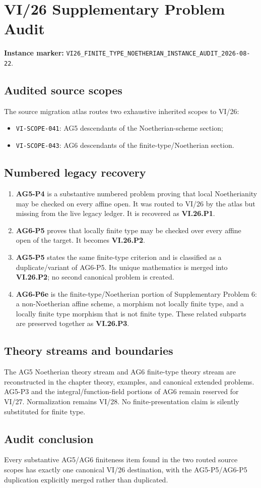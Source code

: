 \chapter*{VI/26 Supplementary Problem Audit}
\label{audit:vi26}
\textbf{Instance marker:} \texttt{VI26\_FINITE\_TYPE\_NOETHERIAN\_INSTANCE\_AUDIT\_2026-08-22}.

\section*{Audited source scopes}
The source migration atlas routes two exhaustive inherited scopes to VI/26:
\begin{itemize}
\item \texttt{VI-SCOPE-041}: AG5 descendants of the Noetherian-scheme section;
\item \texttt{VI-SCOPE-043}: AG6 descendants of the finite-type/Noetherian section.
\end{itemize}

\section*{Numbered legacy recovery}
\begin{enumerate}
\item \textbf{AG5-P4} is a substantive numbered problem proving that local Noetherianity may be checked on every affine open.  It was routed to VI/26 by the atlas but missing from the live legacy ledger.  It is recovered as \textbf{VI.26.P1}.
\item \textbf{AG6-P5} proves that locally finite type may be checked over every affine open of the target.  It becomes \textbf{VI.26.P2}.
\item \textbf{AG5-P5} states the same finite-type criterion and is classified as a duplicate/variant of AG6-P5.  Its unique mathematics is merged into \textbf{VI.26.P2}; no second canonical problem is created.
\item \textbf{AG6-P6e} is the finite-type/Noetherian portion of Supplementary Problem 6: a non-Noetherian affine scheme, a morphism not locally finite type, and a locally finite type morphism that is not finite type.  These related subparts are preserved together as \textbf{VI.26.P3}.
\end{enumerate}

\section*{Theory streams and boundaries}
The AG5 Noetherian theory stream and AG6 finite-type theory stream are reconstructed in the chapter theory, examples, and canonical extended problems.  AG5-P3 and the integral/function-field portions of AG6 remain reserved for VI/27.  Normalization remains VI/28.  No finite-presentation claim is silently substituted for finite type.

\section*{Audit conclusion}
Every substantive AG5/AG6 finiteness item found in the two routed source scopes has exactly one canonical VI/26 destination, with the AG5-P5/AG6-P5 duplication explicitly merged rather than duplicated.

